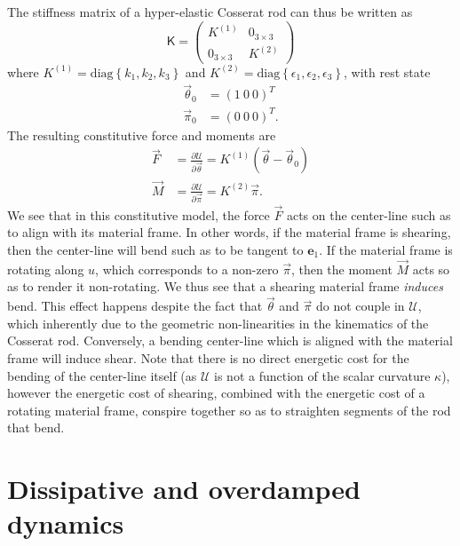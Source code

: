 The stiffness matrix of a hyper-elastic Cosserat rod can thus be written as
\begin{equation}
\mathsf{K} = \begin{pmatrix}
K^{(1)} & 0_{3 \times 3} \\
0_{3 \times 3} & K^{(2)}
\end{pmatrix}
\end{equation}
where $K^{(1)} = \text{diag} \left\{ k_1, k_2, k_3 \right\}$ and $K^{(2)} = \text{diag} \left\{ \epsilon_1, \epsilon_2, \epsilon_3 \right\}$, with rest state
\begin{subequations}
\begin{align}
\vec{\theta}_0 & = (1\ 0\ 0)^T \\
\vec{\pi}_0 & = (0\ 0\ 0)^T.
\end{align}
\end{subequations}
The resulting constitutive force and moments are
\begin{subequations}
\begin{align}
\vec{F} & = \frac{\partial \mathcal{U}}{\partial \vec{\theta}} = K^{(1)} (\vec{\theta} - \vec{\theta}_0) \\
\vec{M} & = \frac{\partial \mathcal{U}}{\partial \vec{\pi}} = K^{(2)} \vec{\pi}.
\end{align}
\end{subequations}
We see that in this constitutive model, the force $\vec{F}$ acts on the center-line such as to align with its material frame. In other words, if the material frame is shearing, then the center-line will bend such as to be tangent to $\mathbf{e}_1$. If the material frame is rotating along $u$, which corresponds to a non-zero $\vec{\pi}$, then the moment $\vec{M}$ acts so as to render it non-rotating.  We thus see that a shearing material frame \textit{induces} bend. This effect happens despite the fact that $\vec{\theta}$ and $\vec{\pi}$ do not couple in $\mathcal{U}$, which inherently due to the geometric non-linearities in the kinematics of the Cosserat rod. Conversely, a bending center-line which is aligned with the material frame will induce shear. Note that there is no direct energetic cost for the bending of the center-line itself (as $\mathcal{U}$ is not a function of the scalar curvature $\kappa$), however the energetic cost of shearing, combined with the energetic cost of a rotating material frame, conspire together so as to straighten segments of the rod that bend.

\section{Dissipative and overdamped dynamics} \label{sec:Dissipative and overdamped dynamics}

